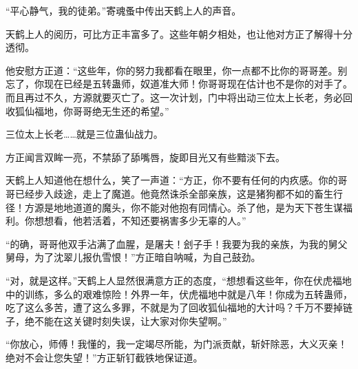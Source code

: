 \begin{this_body}
“平心静气，我的徒弟。”寄魂蚤中传出天鹤上人的声音。

天鹤上人的阅历，可比方正丰富多了。这些年朝夕相处，也让他对方正了解得十分透彻。

他安慰方正道：“这些年，你的努力我都看在眼里，你一点都不比你的哥哥差。别忘了，你现在已经是五转蛊师，奴道准大师！你哥哥现在估计也不是你的对手了。而且再过不久，方源就要灭亡了。这一次计划，门中将出动三位太上长老，务必回收狐仙福地，你哥哥绝无生还的希望。”

三位太上长老……就是三位蛊仙战力。

方正闻言双眸一亮，不禁舔了舔嘴唇，旋即目光又有些黯淡下去。

天鹤上人知道他在想什么，笑了一声道：“方正，你不要有任何的内疚感。你的哥哥已经步入歧途，走上了魔道。他竟然诛杀全部亲族，这是猪狗都不如的畜生行径！方源是地地道道的魔头，你不能对他抱有同情心。杀了他，是为天下苍生谋福利。你想想看，他若活着，不知还要祸害多少无辜的人。”

“的确，哥哥他双手沾满了血腥，是屠夫！刽子手！我要为我的亲族，为我的舅父舅母，为了沈翠儿报仇雪恨！”方正暗自呐喊，为自己鼓劲。

“对，就是这样。”天鹤上人显然很满意方正的态度，“想想看这些年，你在伏虎福地中的训练，多么的艰难惊险！外界一年，伏虎福地中就是八年！你成为五转蛊师，吃了这么多苦，遭了这么多罪，不就是为了回收狐仙福地的大计吗？千万不要掉链子，绝不能在这关键时刻失误，让大家对你失望啊。”

“你放心，师傅！我懂的，我一定竭尽所能，为门派贡献，斩奸除恶，大义灭亲！绝对不会让您失望！”方正斩钉截铁地保证道。

\end{this_body}

